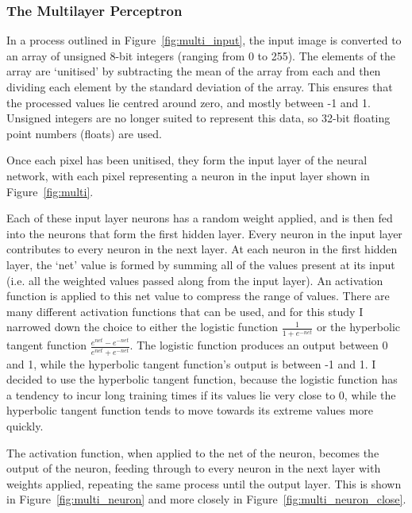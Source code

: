 \subsubsection{The Multilayer Perceptron}



 In a process outlined in Figure~\ref{fig:multi_input}, the input image is converted to an array of unsigned 8-bit integers (ranging from 0 to 255). The elements of the array are `unitised' by subtracting the mean of the array from each and then dividing each element by the standard deviation of the array. This ensures that the processed values lie centred around zero, and mostly between -1 and 1. Unsigned integers are no longer suited to represent this data, so 32-bit floating point numbers (floats) are used. %
 
 Once each pixel has been unitised, they form the input layer of the neural network, with each pixel representing a neuron in the input layer shown in Figure~\ref{fig:multi}. 
 
 Each of these input layer neurons has a random weight applied, and is then fed into the neurons that form the first hidden layer. Every neuron in the input layer contributes to every neuron in the next layer. At each neuron in the first hidden layer, the `net' value is formed by summing all of the values present at its input (i.e. all the weighted values passed along from the input layer). An activation function is applied to this net value to compress the range of values. There are many different activation functions that can be used, and for this study I narrowed down the choice to either the logistic function $ \frac{1}{1 + e^{-net}} $ or the hyperbolic tangent function $\frac{e^{net} - e^{-net}}{e^{net} + e^{-net}} $. The logistic function produces an output between 0 and 1, while the hyperbolic tangent function's output is between -1 and 1. I decided to use the hyperbolic tangent function, because the logistic function has a tendency to incur long training times if its values lie very close to 0, while the hyperbolic tangent function tends to move towards its extreme values more quickly.  
 
 The activation function, when applied to the net of the neuron, becomes the output of the neuron, feeding through to every neuron in the next layer with weights applied, repeating the same process until the output layer. This is shown in Figure~\ref{fig:multi_neuron} and more closely in Figure~\ref{fig:multi_neuron_close}.
 
